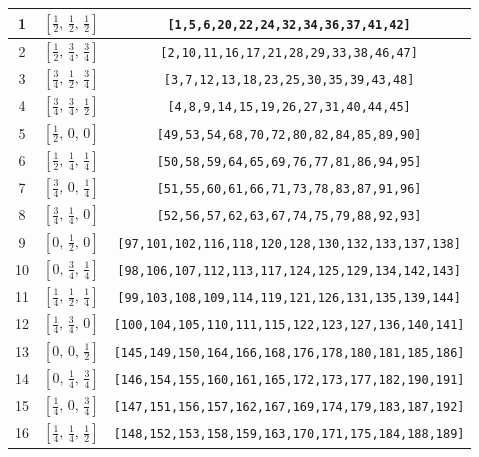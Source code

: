 \documentclass[fleqn,8pt]{jsarticle}
\begin{document}
\begin{longtable}{ccc}
1 & $\left[ \frac{1}{2},\, \frac{1}{2},\, \frac{1}{2} \right]$ & {\tt [1,5,6,20,22,24,32,34,36,37,41,42]} \\ \hline
2 & $\left[ \frac{1}{2},\, \frac{3}{4},\, \frac{3}{4} \right]$ & {\tt [2,10,11,16,17,21,28,29,33,38,46,47]} \\ \hline
3 & $\left[ \frac{3}{4},\, \frac{1}{2},\, \frac{3}{4} \right]$ & {\tt [3,7,12,13,18,23,25,30,35,39,43,48]} \\ \hline
4 & $\left[ \frac{3}{4},\, \frac{3}{4},\, \frac{1}{2} \right]$ & {\tt [4,8,9,14,15,19,26,27,31,40,44,45]} \\ \hline
5 & $\left[ \frac{1}{2},\, 0,\, 0 \right]$ & {\tt [49,53,54,68,70,72,80,82,84,85,89,90]} \\ \hline
6 & $\left[ \frac{1}{2},\, \frac{1}{4},\, \frac{1}{4} \right]$ & {\tt [50,58,59,64,65,69,76,77,81,86,94,95]} \\ \hline
7 & $\left[ \frac{3}{4},\, 0,\, \frac{1}{4} \right]$ & {\tt [51,55,60,61,66,71,73,78,83,87,91,96]} \\ \hline
8 & $\left[ \frac{3}{4},\, \frac{1}{4},\, 0 \right]$ & {\tt [52,56,57,62,63,67,74,75,79,88,92,93]} \\ \hline
9 & $\left[ 0,\, \frac{1}{2},\, 0 \right]$ & {\tt [97,101,102,116,118,120,128,130,132,133,137,138]} \\ \hline
10 & $\left[ 0,\, \frac{3}{4},\, \frac{1}{4} \right]$ & {\tt [98,106,107,112,113,117,124,125,129,134,142,143]} \\ \hline
11 & $\left[ \frac{1}{4},\, \frac{1}{2},\, \frac{1}{4} \right]$ & {\tt [99,103,108,109,114,119,121,126,131,135,139,144]} \\ \hline
12 & $\left[ \frac{1}{4},\, \frac{3}{4},\, 0 \right]$ & {\tt [100,104,105,110,111,115,122,123,127,136,140,141]} \\ \hline
13 & $\left[ 0,\, 0,\, \frac{1}{2} \right]$ & {\tt [145,149,150,164,166,168,176,178,180,181,185,186]} \\ \hline
14 & $\left[ 0,\, \frac{1}{4},\, \frac{3}{4} \right]$ & {\tt [146,154,155,160,161,165,172,173,177,182,190,191]} \\ \hline
15 & $\left[ \frac{1}{4},\, 0,\, \frac{3}{4} \right]$ & {\tt [147,151,156,157,162,167,169,174,179,183,187,192]} \\ \hline
16 & $\left[ \frac{1}{4},\, \frac{1}{4},\, \frac{1}{2} \right]$ & {\tt [148,152,153,158,159,163,170,171,175,184,188,189]} \\
\end{longtable}
\renewcommand{\arraystretch}{1.2}
\end{document}
